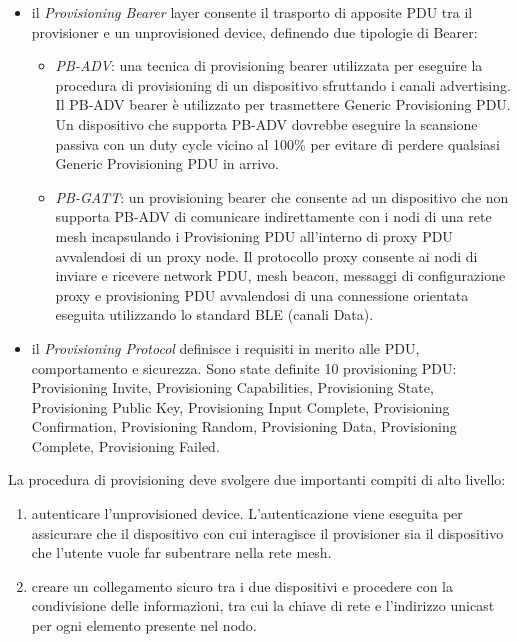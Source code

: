 \begin{itemize}
    \item il \textit{Provisioning Bearer} layer consente il trasporto di apposite PDU tra il provisioner e un unprovisioned device, definendo due tipologie di Bearer:
    \begin{itemize}
        \item \textit{PB-ADV}: una tecnica di provisioning bearer utilizzata per eseguire la procedura di provisioning di un dispositivo sfruttando i canali advertising. Il PB-ADV bearer è utilizzato per trasmettere Generic Provisioning PDU.\\
        Un dispositivo che supporta PB-ADV dovrebbe eseguire la scansione passiva con un duty cycle vicino al 100\% per evitare di perdere qualsiasi Generic Provisioning PDU in arrivo.
        
        \item \textit{PB-GATT}: un provisioning bearer che consente ad un dispositivo che non supporta PB-ADV di comunicare indirettamente con i nodi di una rete mesh incapsulando i Provisioning PDU all'interno di proxy PDU avvalendosi di un proxy node. Il protocollo proxy consente ai nodi di inviare e ricevere network PDU, mesh beacon, messaggi di configurazione proxy e provisioning PDU avvalendosi di una connessione orientata eseguita utilizzando lo standard BLE (canali Data).
    \end{itemize}
    
    \item il \textit{Provisioning Protocol} definisce i requisiti in merito alle PDU, comportamento e sicurezza. Sono state definite 10 provisioning PDU: Provisioning Invite, Provisioning Capabilities, Provisioning State, Provisioning Public Key, Provisioning Input Complete, Provisioning Confirmation, Provisioning Random, Provisioning Data, Provisioning Complete, Provisioning Failed.
\end{itemize}

\noindent La procedura di provisioning deve svolgere due importanti compiti di alto livello:
\begin{enumerate}
    \item autenticare l'unprovisioned device. L'autenticazione viene eseguita per assicurare che il dispositivo con cui interagisce il provisioner sia il dispositivo che l'utente vuole far subentrare nella rete mesh.
    
    \item creare un collegamento sicuro tra i due dispositivi e procedere con la condivisione delle informazioni, tra cui la chiave di rete e l'indirizzo unicast per ogni elemento presente nel nodo.
\end{enumerate}

